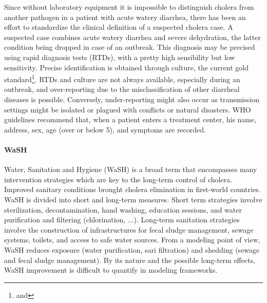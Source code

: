Since without laboratory equipment it is impossible to distinguish cholera from another pathogen in a patient with acute watery diarrhea, there has been an effort to standardize the clinical definition of a suspected cholera case. %
A suspected case combines acute watery diarrhea and severe dehydration, the latter condition being dropped in case of an outbreak. This diagnosis may be precised using rapid diagnosis tests (RTDs), with a pretty high sensibility but low sensitivity. Precise identification is obtained through culture, the current gold standard\footnote{ and }. RTDs and culture are not always available, especially during an outbreak, and over-reporting due to the misclassification of other diarrheal diseases is possible. Conversely, under-reporting might also occur as transmission settings might be isolated or plagued with conflicts or natural disasters. WHO guidelines recommend that, when a patient enters a treatment center, his name, address, sex, age (over or below 5), and symptoms are recorded\cite{WHO:FirstStepsManaging:2010}. %

\paragraph{WaSH} Water, Sanitation and Hygiene (WaSH) is a broad term that encompasses many intervention strategies which are key to the long-term control of cholera. Improved sanitary conditions brought cholera elimination in first-world countries. WaSH is divided into short and long-term measures. Short term strategies involve sterilization, decontamination, hand washing, education sessions, and water purification and filtering (chlorination, ...)\cite[-3\baselineskip]{Rebaudet:NationalAlertresponseStrategy:2018,Fewtrell:WaterSanitationHygiene:2005}. Long-term sanitation strategies involve the construction of infrastructures for fecal sludge management, sewage systems, toilets, and access to safe water sources. From a modeling point of view, WaSH reduces exposure (water purification, sari filtration\cite{Colwell:ReductionCholeraBangladeshi:2003}) and shedding (sewage and fecal sludge management). By its nature and the possible long-term effects, WaSH improvement is difficult to quantify in modeling frameworks.

